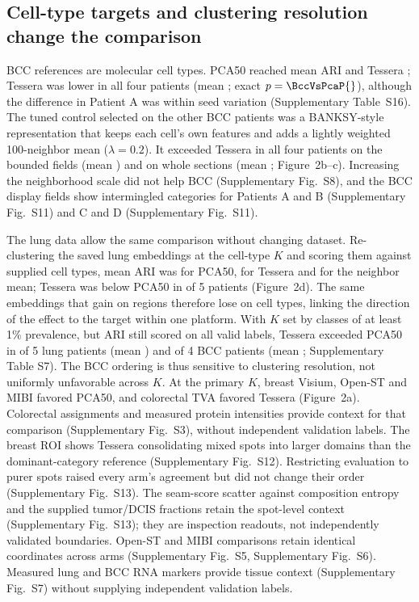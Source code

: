 \documentclass[11pt]{article}
\begin{document}
\subsection{Cell-type targets and clustering resolution change the comparison}
BCC references are molecular cell types. PCA50 reached mean ARI \BccPca{} and Tessera \BccFull{}; Tessera was lower in all four patients (mean \BccDelta{}; exact \(p=\BccVsPcaP{}\)), although the difference in Patient A was within seed variation (Supplementary Table~S16). The tuned control selected on the other BCC patients was a BANKSY-style representation that keeps each cell's own features and adds a lightly weighted 100-neighbor mean (\(\lambda=0.2\)). It exceeded Tessera in all four patients on the bounded fields (mean \BccNestedDelta{}) and on whole sections (mean \BccWholeVsControlMean{}; Figure~2b--c). Increasing the neighborhood scale did not help BCC (Supplementary Fig.~S8), and the BCC display fields show intermingled categories for Patients A and B (Supplementary Fig.~S11) and C and D (Supplementary Fig.~S11).

The lung data allow the same comparison without changing dataset. Re-clustering the saved lung embeddings at the cell-type \(K\) and scoring them against supplied cell types, mean ARI was \CellTypePca{} for PCA50, \CellTypeTessera{} for Tessera and \CellTypeMean{} for the neighbor mean; Tessera was below PCA50 in \CellTypeTesseraLower{} of 5 patients (Figure~2d). The same embeddings that gain on regions therefore lose on cell types, linking the direction of the effect to the target within one platform. With \(K\) set by classes of at least 1\% prevalence, but ARI still scored on all valid labels, Tessera exceeded PCA50 in \LungCommonKBetter{} of 5 lung patients (mean \LungCommonKDelta{}) and \BccCommonKBetter{} of 4 BCC patients (mean \BccCommonKDelta{}; Supplementary Table S7). The BCC ordering is thus sensitive to clustering resolution, not uniformly unfavorable across \(K\). At the primary \(K\), breast Visium, Open-ST and MIBI favored PCA50, and colorectal TVA favored Tessera (Figure~2a). Colorectal assignments and measured protein intensities provide context for that comparison (Supplementary Fig.~S3), without independent validation labels. The breast ROI shows Tessera consolidating mixed spots into larger domains than the dominant-category reference (Supplementary Fig.~S12). Restricting evaluation to purer spots raised every arm's agreement but did not change their order (Supplementary Fig.~S13). The seam-score scatter against composition entropy and the supplied tumor/DCIS fractions retain the spot-level context (Supplementary Fig.~S13); they are inspection readouts, not independently validated boundaries. Open-ST and MIBI comparisons retain identical coordinates across arms (Supplementary Fig.~S5, Supplementary Fig.~S6). Measured lung and BCC RNA markers provide tissue context (Supplementary Fig.~S7) without supplying independent validation labels.
\end{document}
